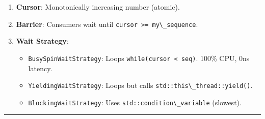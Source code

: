 \begin{enumerate}
\def\labelenumi{\arabic{enumi}.}
\tightlist
\item
  \textbf{Cursor}: Monotonically increasing number (atomic).
\item
  \textbf{Barrier}: Consumers wait until
  \passthrough{\lstinline!cursor >= my\_sequence!}.
\item
  \textbf{Wait Strategy}:

  \begin{itemize}
  \tightlist
  \item
    \passthrough{\lstinline!BusySpinWaitStrategy!}: Loops
    \passthrough{\lstinline!while(cursor < seq)!}. 100\% CPU, 0ns
    latency.
  \item
    \passthrough{\lstinline!YieldingWaitStrategy!}: Loops but calls
    \passthrough{\lstinline!std::this\_thread::yield()!}.
  \item
    \passthrough{\lstinline!BlockingWaitStrategy!}: Uses
    \passthrough{\lstinline!std::condition\_variable!} (slowest).
  \end{itemize}
\end{enumerate}

\begin{center}\rule{0.5\linewidth}{0.5pt}\end{center}

